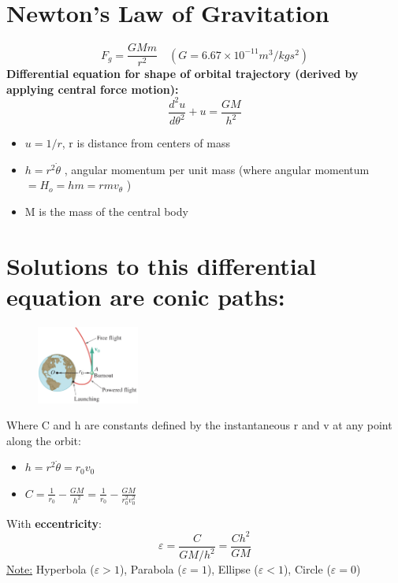\documentclass[10pt, fleqn]{article}
\begin{document}
\begin{multicols}{2}
\section*{Newton's Law of Gravitation}
\[F_g=\frac{GMm}{r^2} \quad (G=6.67\times10^{-11} m^3/kgs^2)\]
\textbf{Differential equation for shape of orbital trajectory (derived by applying central force motion):}
\[\frac{d^2u}{d\theta^2} + u = \frac{GM}{h^2}\]
\begin{itemize}
    \item $u=1/r$, r is distance from centers of mass 
    \item $h=r^2\dot{\theta}$ , angular momentum per unit mass (where angular momentum $=H_o=hm=rmv_\theta$ )
    \item M is the mass of the central body
\end{itemize}
\section*{Solutions to this differential equation are conic paths:} 
\begin{figure}[H]
    \centering
    \includegraphics[width=0.3\textwidth]{orbital.png}
\end{figure}
\begin{center}
\end{center}
Where C and h are constants defined by the instantaneous r and v at any point along the orbit:
\begin{itemize}
    \item $h =  r^2\dot{\theta} = r_0v_0$ 
    \item $C = \frac{1}{r_0} - \frac{GM}{h^2} = \frac{1}{r_0} - \frac{GM}{r_0^2v_0^2}$
\end{itemize}
With \textbf{eccentricity}:
\[\varepsilon = \frac{C}{GM/h^2} = \frac{Ch^2}{GM}\]
\underline{Note:} Hyperbola ($\varepsilon > 1$), Parabola ($\varepsilon = 1$), Ellipse ($\varepsilon < 1$), Circle ($\varepsilon = 0$)

\end{multicols}
\end{document}
